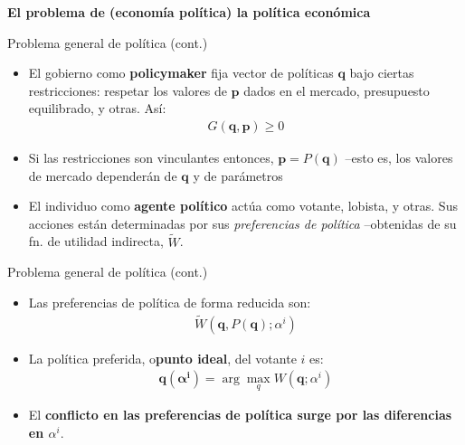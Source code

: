 \documentclass[
  ignorenonframetext,
]{beamer}
\providecommand{\tightlist}{%
  \setlength{\itemsep}{0pt}\setlength{\parskip}{0pt}}\usepackage{longtable,booktabs,array}
\begin{document}
\begin{frame}{\textbf{El problema de (economía política) la política
económica}}
\begin{block}{Problema general de política (cont.)}
\protect\hypertarget{problema-general-de-poluxedtica-cont.-1}{}
\begin{itemize}
\tightlist
\item
  El gobierno como \textbf{policymaker} fija vector de políticas
  \(\mathbf{q}\) bajo ciertas restricciones: respetar los valores de
  \(\mathbf{p}\) dados en el mercado, presupuesto equilibrado, y otras.
  Así: \[\begin{aligned}
  G(\mathbf{q},\mathbf{p})\geq 0
  \end{aligned}\]
\item
  Si las restricciones son vinculantes entonces,
  \(\mathbf{p}=P(\mathbf{q})\) --esto es, los valores de mercado
  dependerán de \(\mathbf{q}\) y de parámetros
\item
  El individuo como \textbf{agente político} actúa como votante,
  lobista, y otras. Sus acciones están determinadas por sus
  \emph{preferencias de política} --obtenidas de su fn. de utilidad
  indirecta, \(\tilde{W}\).
\end{itemize}
\end{block}

\begin{block}{Problema general de política (cont.)}
\protect\hypertarget{problema-general-de-poluxedtica-cont.-2}{}
\begin{itemize}
\tightlist
\item
  Las preferencias de política de forma reducida son: \[\begin{aligned}
  \tilde{W}(\mathbf{q},P(\mathbf{q});\alpha^{i})
  \end{aligned}\]
\item
  La política preferida, o\textbf{punto ideal}, del votante \(i\) es:
  \[\begin{aligned}
  \mathbf{q(\alpha^{i})}=\arg\max_{q} W(\mathbf{q};\alpha^{i})
  \end{aligned}\]
\item
  El \textbf{conflicto en las preferencias de política surge por las
  diferencias en \(\alpha^{i}\)}.
\end{itemize}
\end{block}


\end{frame}
\end{document}
